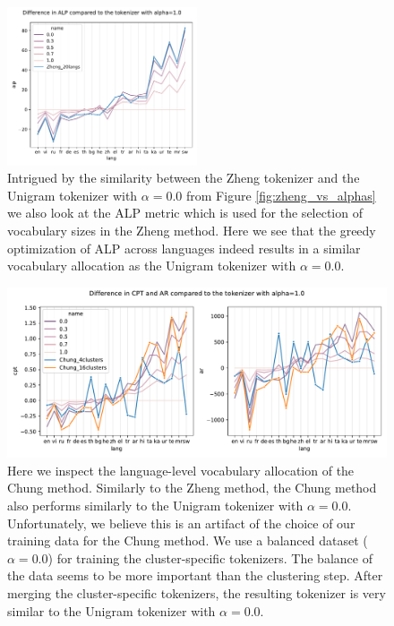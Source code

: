 \begin{figure}
    \centering
    \includegraphics[width=0.5\textwidth]{figures/zheng_vs_alphas_alp.pdf}
    \caption{Intrigued by the similarity between the Zheng tokenizer and the Unigram tokenizer with $\alpha=0.0$ from Figure \ref{fig:zheng_vs_alphas} we also look at the ALP metric which is used for the selection of vocabulary sizes in the Zheng method. Here we see that the greedy optimization of ALP across languages indeed results in a similar vocabulary allocation as the Unigram tokenizer with $\alpha=0.0$.}
    \label{fig:zheng_vs_alphas_alp}
\end{figure}

\begin{figure}
    \centering
    \includegraphics[width=\textwidth]{figures/chung_vs_alphas.pdf}
    \caption{Here we inspect the language-level vocabulary allocation of the Chung method. Similarly to the Zheng method, the Chung method also performs similarly to the Unigram tokenizer with $\alpha=0.0$. Unfortunately, we believe this is an artifact of the choice of our training data for the Chung method. We use a balanced dataset ($\alpha=0.0$) for training the cluster-specific tokenizers. The balance of the data seems to be more important than the clustering step. After merging the cluster-specific tokenizers, the resulting tokenizer is very similar to the Unigram tokenizer with $\alpha=0.0$.}
    \label{fig:chung_vs_alphas}
\end{figure}

